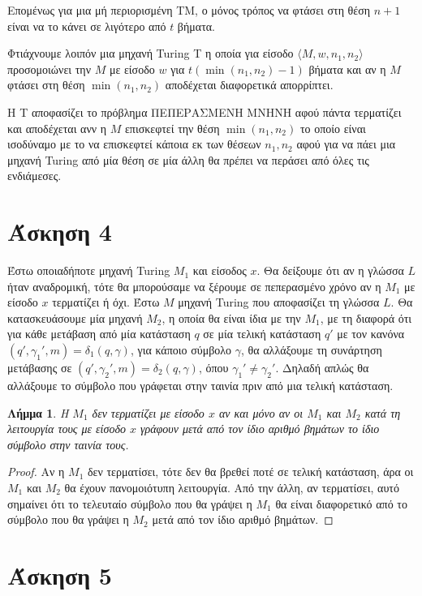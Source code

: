 \documentclass[a4paper, oneside, 11pt]{article}
\newtheorem{lm}[thm]{Λήμμα}
\theoremstyle{definition}
\begin{document}
Επομένως για μια μή περιορισμένη TM, ο μόνος τρόπος να φτάσει στη θέση $n+1$ είναι να
το κάνει σε λιγότερο από $t$ βήματα.

Φτιάχνουμε λοιπόν μια μηχανή Turing T η οποία για είσοδο $\langle M, w, n_1, n_2
\rangle$ προσομοιώνει την $M$ με είσοδο $w$ για $t(\min(n_1, n_2)-1)$ βήματα και αν η
$M$ φτάσει στη θέση $\min(n_1, n_2)$ αποδέχεται διαφορετικά απορρίπτει.

Η T αποφασίζει το πρόβλημα ΠΕΠΕΡΑΣΜΕΝΗ ΜΝΗΝΗ αφού πάντα τερματίζει και αποδέχεται ανν
η $M$ επισκεφτεί την θέση $\min(n_1, n_2)$ το οποίο είναι ισοδύναμο με το να
επισκεφτεί κάποια εκ των θέσεων $n_1, n_2$ αφού για να πάει μια μηχανή Turing από μία
θέση σε μία άλλη θα πρέπει να περάσει από όλες τις ενδιάμεσες.

\section*{Άσκηση 4}

Έστω οποιαδήποτε μηχανή Turing $M_1$ και είσοδος $x$. Θα δείξουμε ότι αν η γλώσσα $L$ ήταν αναδρομική,
τότε θα μπορούσαμε να ξέρουμε σε πεπερασμένο χρόνο αν η $M_1$ με είσοδο $x$ τερματίζει ή όχι.
Έστω $M$ μηχανή Turing που αποφασίζει τη γλώσσα $L$. Θα κατασκευάσουμε μία μηχανή $M_2$, η οποία θα είναι
ίδια με την $M_1$, με τη διαφορά ότι για κάθε μετάβαση από μία κατάσταση $q$ σε μία τελική κατάσταση $q'$ 
με τον κανόνα $(q',\gamma_1',m)=\delta_1(q,\gamma)$, για κάποιο σύμβολο $\gamma$, θα αλλάξουμε τη συνάρτηση
μετάβασης σε $(q',\gamma_2',m)=\delta_2(q,\gamma)$, όπου $\gamma_1'\neq \gamma_2'$. Δηλαδή απλώς θα αλλάξουμε το σύμβολο που γράφεται
στην ταινία πριν από μια τελική κατάσταση.
\begin{lm}
Η $M_1$ δεν τερματίζει με είσοδο $x$ αν και μόνο αν οι $M_1$ και $M_2$ κατά τη λειτουργία τους με είσοδο
$x$ γράφουν μετά από τον ίδιο αριθμό βημάτων το ίδιο σύμβολο στην ταινία τους.
\end{lm}
\begin{proof}
Αν η $Μ_1$ δεν τερματίσει, τότε δεν θα βρεθεί ποτέ σε τελική κατάσταση, άρα οι $Μ_1$ και $Μ_2$ θα έχουν 
πανομοιότυπη λειτουργία.
Από την άλλη, αν τερματίσει, αυτό σημαίνει ότι το τελευταίο σύμβολο που θα γράψει η $Μ_1$ θα είναι 
διαφορετικό από το σύμβολο που θα γράψει η $Μ_2$ μετά από τον ίδιο αριθμό βημάτων.
\end{proof}

\section*{Άσκηση 5}
\end{document}
